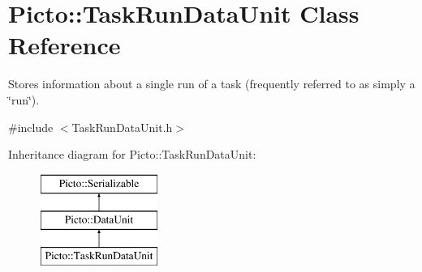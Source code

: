 \hypertarget{class_picto_1_1_task_run_data_unit}{\section{Picto\-:\-:Task\-Run\-Data\-Unit Class Reference}
\label{class_picto_1_1_task_run_data_unit}
}


Stores information about a single run of a task (frequently referred to as simply a \char`\"{}run\char`\"{}).  




{\ttfamily \#include $<$Task\-Run\-Data\-Unit.\-h$>$}

Inheritance diagram for Picto\-:\-:Task\-Run\-Data\-Unit\-:\begin{figure}[H]
\begin{center}
\leavevmode
\includegraphics[height=3.000000cm]{class_picto_1_1_task_run_data_unit}
\end{center}
\end{figure}
